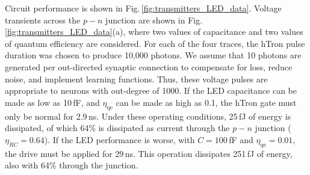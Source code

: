 \documentclass[aip,amsmath,amssymb,reprint,nofootinbib]{revtex4-1}
\begin{document}
Circuit performance is shown in Fig.\,\ref{fig:transmitters_LED_data}. Voltage transients across the $p-n$ junction are shown in Fig. \ref{fig:transmitters_LED_data}(a), where two values of capacitance and two values of quantum efficiency are considered. For each of the four traces, the hTron pulse duration was chosen to produce 10,000 photons. We assume that 10 photons are generated per out-directed synaptic connection to compensate for loss, reduce noise, and implement learning functions. Thus, these voltage pulses are appropriate to neurons with out-degree of 1000. If the LED capacitance can be made as low as 10\,fF, and $\eta_{\mathrm{qe}}$ can be made as high as 0.1, the hTron gate must only be normal for 2.9\,ns. Under these operating conditions, 25\,fJ of energy is dissipated, of which 64\% is dissipated as current through the $p-n$ junction ($\eta_{RC}=0.64$). If the LED performance is worse, with $C = 100$\,fF and $\eta_{\mathrm{qe}} = 0.01$, the drive must be applied for 29\,ns. This operation dissipates 251\,fJ of energy, also with 64\% through the junction.
\end{document}

